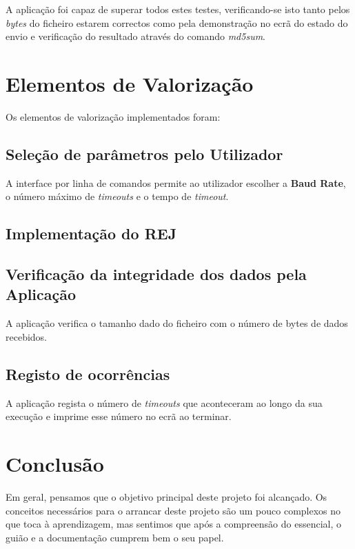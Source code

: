 \documentclass[11pt]{article}
\begin{document}
A aplicação foi capaz de superar todos estes testes, verificando-se isto tanto pelos \textit{bytes} do ficheiro estarem correctos como pela demonstração no ecrã do estado do envio e verificação do resultado através do comando \textit{md5sum}.


\newpage
\section{Elementos de Valorização}

Os elementos de valorização implementados foram:

\subsection{Seleção de parâmetros pelo Utilizador}

A interface por linha de comandos permite ao utilizador escolher a \textbf{Baud Rate}, o número máximo de \textit{timeouts} e o tempo de \textit{timeout}.

\subsection{Implementação do REJ}



\subsection{Verificação da integridade dos dados pela Aplicação}

A aplicação verifica o tamanho dado do ficheiro com o número de bytes de dados recebidos.

\subsection{Registo de ocorrências}

A aplicação regista o número de \textit{timeouts} que aconteceram ao longo da sua execução e imprime esse número no ecrã ao terminar.

\newpage
\section{Conclusão}

Em geral, pensamos que o objetivo principal deste projeto foi alcançado. Os conceitos necessários para o arrancar deste projeto são um pouco complexos no que toca à aprendizagem, mas sentimos que após a compreensão do essencial, o guião e a documentação cumprem bem o seu papel.
\end{document}
